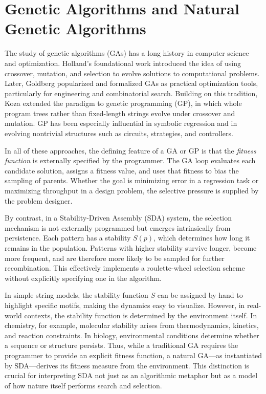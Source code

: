 \documentclass[life,article,submit,pdftex,moreauthors]{Definitions/mdpi}
\begin{document}
\section{Genetic Algorithms and Natural Genetic Algorithms}

The study of genetic algorithms (GAs) has a long history in computer science and optimization. 
Holland’s foundational work \cite{holland1975adaptation} introduced the idea of using crossover, 
mutation, and selection to evolve solutions to computational problems. Later, Goldberg 
\cite{goldberg1989genetic} popularized and formalized GAs as practical optimization tools, 
particularly for engineering and combinatorial search. Building on this tradition, Koza 
\cite{koza1992genetic} extended the paradigm to genetic programming (GP), in which whole 
program trees rather than fixed-length strings evolve under crossover and mutation. GP has 
been especially influential in symbolic regression and in evolving nontrivial structures such 
as circuits, strategies, and controllers.

In all of these approaches, the defining feature of a GA or GP is that the \emph{fitness function} 
is externally specified by the programmer. The GA loop evaluates each candidate solution, assigns 
a fitness value, and uses that fitness to bias the sampling of parents. Whether the goal is 
minimizing error in a regression task or maximizing throughput in a design problem, the selective 
pressure is supplied by the problem designer.


By contrast, in a Stability-Driven Assembly (SDA) system, the selection mechanism is not externally
programmed but emerges intrinsically from persistence. Each pattern has a stability $S(p)$, 
which determines how long it remains in the population. Patterns with higher stability survive
longer, become more frequent, and are therefore more likely to be sampled for further
recombination. This effectively implements a roulette-wheel selection scheme without explicitly specifying one in the algorithm.

In simple string models, the stability function $S$ can be assigned by hand to highlight specific motifs, making the dynamics easy to visualize. However, in real-world contexts, the stability
function is determined by the environment itself. In chemistry, for example, molecular stability 
arises from thermodynamics, kinetics, and reaction constraints. In biology, environmental conditions 
determine whether a sequence or structure persists. Thus, while a traditional GA requires the 
programmer to provide an explicit fitness function, a natural GA---as instantiated by SDA---derives 
its fitness measure from the environment. This distinction is crucial for interpreting SDA not just as an algorithmic metaphor but as a model of how nature itself performs search and selection.
\end{document}
